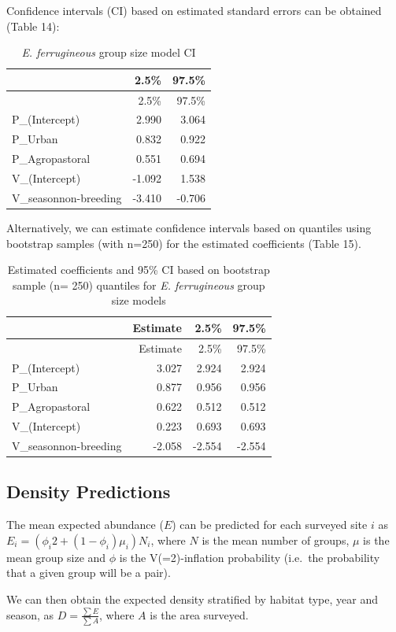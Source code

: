 \documentclass[]{article}
\begin{document}
Confidence intervals (CI) based on estimated standard errors can be
obtained (Table 14):

\begin{longtable}[]{@{}lrr@{}}
\caption{\textit{E. ferrugineous} group size model CI}\tabularnewline
\toprule
& 2.5\% & 97.5\%\tabularnewline
\midrule
\endfirsthead
\toprule
& 2.5\% & 97.5\%\tabularnewline
\midrule
\endhead
P\_(Intercept) & 2.990 & 3.064\tabularnewline
P\_Urban & 0.832 & 0.922\tabularnewline
P\_Agropastoral & 0.551 & 0.694\tabularnewline
V\_(Intercept) & -1.092 & 1.538\tabularnewline
V\_seasonnon-breeding & -3.410 & -0.706\tabularnewline
\bottomrule
\end{longtable}

Alternatively, we can estimate confidence intervals based on quantiles
using bootstrap samples (with n=250) for the estimated coefficients
(Table 15).

\begin{longtable}[]{@{}lrrr@{}}
\caption{Estimated coefficients and 95\% CI based on bootstrap sample
(n= 250) quantiles for \textit{E. ferrugineous} group size
models}\tabularnewline
\toprule
& Estimate & 2.5\% & 97.5\%\tabularnewline
\midrule
\endfirsthead
\toprule
& Estimate & 2.5\% & 97.5\%\tabularnewline
\midrule
\endhead
P\_(Intercept) & 3.027 & 2.924 & 2.924\tabularnewline
P\_Urban & 0.877 & 0.956 & 0.956\tabularnewline
P\_Agropastoral & 0.622 & 0.512 & 0.512\tabularnewline
V\_(Intercept) & 0.223 & 0.693 & 0.693\tabularnewline
V\_seasonnon-breeding & -2.058 & -2.554 & -2.554\tabularnewline
\bottomrule
\end{longtable}

\subsection{Density Predictions}\label{density-predictions}

The mean expected abundance (\(E\)) can be predicted for each surveyed
site \(i\) as \(E_{i} = (\phi_{i} 2 + (1 - \phi_{i})\mu_{i})N_{i}\),
where \(N\) is the mean number of groups, \(\mu\) is the mean group size
and \(\phi\) is the V(=2)-inflation probability (i.e.~the probability
that a given group will be a pair).

We can then obtain the expected density stratified by habitat type, year
and season, as \(D = \frac{\sum E}{\sum A}\), where \(A\) is the area
surveyed.
\end{document}
